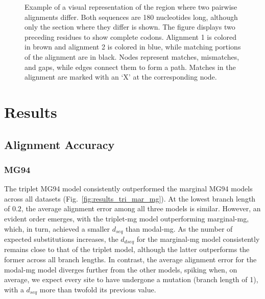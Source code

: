 \begin{figure}[!ht]
 \centering
 \setlength{\columnsep}{-4cm}
 \begin{multicols}{2}
\vspace*{2.5em}
\hspace{-5cm}
% 

\columnbreak


\end{multicols}
 \vspace{1mm}
 \caption[Dot plot example]{Example of a visual representation of the region where two pairwise alignments differ. Both sequences are 180 nucleotides long, although only the section where they differ is shown. The figure displays two preceding residues to show complete codons. Alignment 1 is colored in brown and alignment 2 is colored in blue, while matching portions of the alignment are in black. Nodes represent matches, mismatches, and gaps, while edges connect them to form a path. Matches in the alignment are marked with an `X' at the corresponding node.}
 \label{fig:dotplot-example}
\end{figure}

\clearpage

\section{Results}

\subsection{Alignment Accuracy} %

\subsubsection{MG94}

The triplet MG94 model consistently outperformed the marginal MG94 models across all datasets (Fig.~\ref{fig:results_tri_mar_mg}). At the lowest branch length of $0.2$, the average alignment error among all three models is similar. However, an evident order emerges, with the triplet-mg model outperforming marginal-mg, which, in turn, achieved a smaller $d_{seq}$ than modal-mg. As the number of expected substitutions increases, the $d_{dseq}$ for the marginal-mg model consistently remains close to that of the triplet model, although the latter outperforms the former across all branch lengths. In contrast, the average alignment error for the modal-mg model diverges further from the other models, spiking when, on average, we expect every site to have undergone a mutation (branch length of 1), with a $d_{seq}$ more than twofold its previous value.

